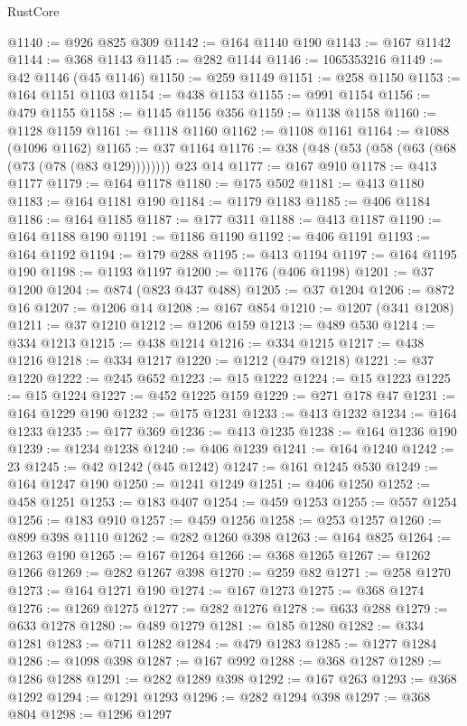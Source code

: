 \begin{lexlean}{RustCore}
\begin{coremodule}
@1140 := @926 @825 @309
@1142 := @164 @1140 @190
@1143 := @167 @1142
@1144 := @368 @1143
@1145 := @282 @1144
@1146 := 1065353216
@1149 := @42 @1146 (@45 @1146)
@1150 := @259 @1149
@1151 := @258 @1150
@1153 := @164 @1151 @1103
@1154 := @438 @1153
@1155 := @991 @1154
@1156 := @479 @1155
@1158 := @1145 @1156 @356
@1159 := @1138 @1158
@1160 := @1128 @1159
@1161 := @1118 @1160
@1162 := @1108 @1161
@1164 := @1088 (@1096 @1162)
@1165 := @37 @1164
@1176 := @38 (@48 (@53 (@58 (@63 (@68 (@73 (@78 (@83 @129)))))))) @23 @14
@1177 := @167 @910
@1178 := @413 @1177
@1179 := @164 @1178
@1180 := @175 @502
@1181 := @413 @1180
@1183 := @164 @1181 @190
@1184 := @1179 @1183
@1185 := @406 @1184
@1186 := @164 @1185
@1187 := @177 @311
@1188 := @413 @1187
@1190 := @164 @1188 @190
@1191 := @1186 @1190
@1192 := @406 @1191
@1193 := @164 @1192
@1194 := @179 @288
@1195 := @413 @1194
@1197 := @164 @1195 @190
@1198 := @1193 @1197
@1200 := @1176 (@406 @1198)
@1201 := @37 @1200
@1204 := @874 (@823 @437 @488)
@1205 := @37 @1204
@1206 := @872 @16
@1207 := @1206 @14
@1208 := @167 @854
@1210 := @1207 (@341 @1208)
@1211 := @37 @1210
@1212 := @1206 @159
@1213 := @489 @530
@1214 := @334 @1213
@1215 := @438 @1214
@1216 := @334 @1215
@1217 := @438 @1216
@1218 := @334 @1217
@1220 := @1212 (@479 @1218)
@1221 := @37 @1220
@1222 := @245 @652
@1223 := @15 @1222
@1224 := @15 @1223
@1225 := @15 @1224
@1227 := @452 @1225 @159
@1229 := @271 @178 @47
@1231 := @164 @1229 @190
@1232 := @175 @1231
@1233 := @413 @1232
@1234 := @164 @1233
@1235 := @177 @369
@1236 := @413 @1235
@1238 := @164 @1236 @190
@1239 := @1234 @1238
@1240 := @406 @1239
@1241 := @164 @1240
@1242 := 23
@1245 := @42 @1242 (@45 @1242)
@1247 := @161 @1245 @530
@1249 := @164 @1247 @190
@1250 := @1241 @1249
@1251 := @406 @1250
@1252 := @458 @1251
@1253 := @183 @407
@1254 := @459 @1253
@1255 := @557 @1254
@1256 := @183 @910
@1257 := @459 @1256
@1258 := @253 @1257
@1260 := @899 @398 @1110
@1262 := @282 @1260 @398
@1263 := @164 @825
@1264 := @1263 @190
@1265 := @167 @1264
@1266 := @368 @1265
@1267 := @1262 @1266
@1269 := @282 @1267 @398
@1270 := @259 @82
@1271 := @258 @1270
@1273 := @164 @1271 @190
@1274 := @167 @1273
@1275 := @368 @1274
@1276 := @1269 @1275
@1277 := @282 @1276
@1278 := @633 @288
@1279 := @633 @1278
@1280 := @489 @1279
@1281 := @185 @1280
@1282 := @334 @1281
@1283 := @711 @1282
@1284 := @479 @1283
@1285 := @1277 @1284
@1286 := @1098 @398
@1287 := @167 @992
@1288 := @368 @1287
@1289 := @1286 @1288
@1291 := @282 @1289 @398
@1292 := @167 @263
@1293 := @368 @1292
@1294 := @1291 @1293
@1296 := @282 @1294 @398
@1297 := @368 @804
@1298 := @1296 @1297

\end{coremodule}
\end{lexlean}
